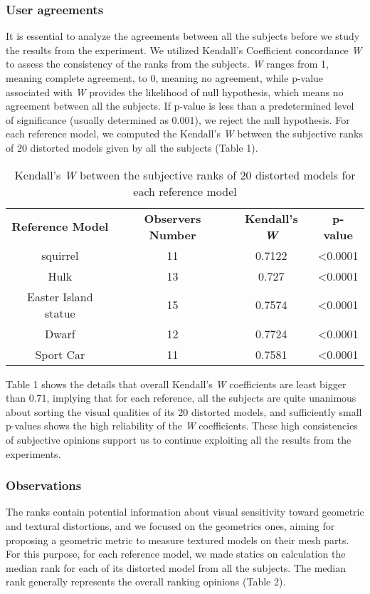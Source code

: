 \subsubsection{User agreements}
It is essential to analyze the agreements between all the subjects before we study the results from the experiment.  We utilized Kendall’s Coefficient concordance \textit{W} \cite{Kendall_1940} to assess the consistency of the ranks from the subjects.  \textit{W} ranges from 1, meaning complete agreement, to 0, meaning no agreement, while p-value associated with \textit{W} provides the likelihood of null hypothesis, which means no agreement between all the subjects. If p-value is less than a predetermined level of significance (usually determined as 0.001), we reject the null hypothesis. For each reference model, we computed the Kendall’s \textit{W} between the subjective ranks of 20 distorted models given by all the subjects (Table 1).\\
\begin{table} 
    \begin{tabular}{ c c c c }
        \textbf{Reference Model} & \textbf{Observers Number} & \textbf{Kendall's \textit{W}} & \textbf{p-value} \\ 
        squirrel & 11 & 0.7122 & <0.0001 \\ 
        Hulk & 13 & 0.727 & <0.0001 \\ 
        Easter Island statue & 15 & 0.7574 & <0.0001 \\ 
        Dwarf & 12 & 0.7724 & <0.0001 \\ 
        Sport Car & 11 & 0.7581 & <0.0001 \\ 
    \end{tabular} 
    \caption{Kendall’s \textit{W} between the subjective ranks of 20 distorted models for each reference model} 
\end{table}
Table 1 shows the details that overall Kendall’s \textit{W} coefficients are least bigger than 0.71, implying that for each reference, all the subjects are quite unanimous about sorting the visual qualities of its 20 distorted models, and sufficiently small p-values shows the high reliability of the \textit{W} coefficients. These high consistencies of subjective opinions support us to continue exploiting all the results from the experiments.\\
\subsubsection{Observations}
The ranks contain potential information about visual sensitivity toward geometric and textural distortions, and we focused on the geometrics ones, aiming for proposing a geometric metric to measure textured models on their mesh parts.  For this purpose, for each reference model, we made statics on calculation the median rank for each of its distorted model from all the subjects. The median rank generally represents the overall ranking opinions (Table 2). \\

